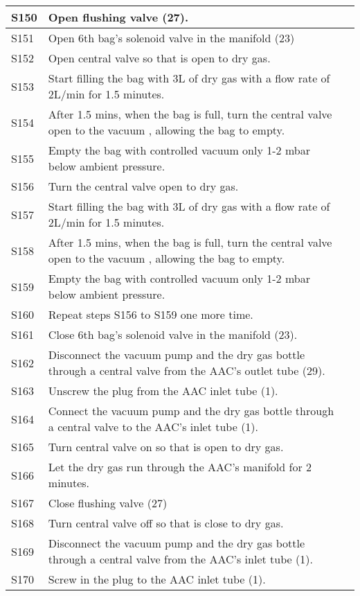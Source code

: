 \begin{longtable} {|m{}|m{}|m{}|}
S150 & Open flushing valve (27). & \\ \hline
S151 & Open 6th bag's solenoid valve in the manifold (23) & \\ \hline
S152 & Open central valve so that is open to dry gas. & \\ \hline
S153 & Start filling the bag with 3L of dry gas with a flow rate of 2L/min for 1.5 minutes. & \\ \hline
S154 & After 1.5 mins, when the bag is full, turn the central valve open to the vacuum , allowing the bag to empty. & \\ \hline
S155 & Empty the bag with controlled vacuum only 1-2 mbar below ambient pressure. & \\ \hline
S156 & Turn the central valve open to dry gas. & \\ \hline
S157 & Start filling the bag with 3L of dry gas with a flow rate of 2L/min for 1.5 minutes. & \\ \hline
S158 & After 1.5 mins, when the bag is full, turn the central valve open to the vacuum , allowing the bag to empty. & \\ \hline
S159 & Empty the bag with controlled vacuum only 1-2 mbar below ambient pressure. & \\ \hline
S160 & Repeat steps S156 to S159 one more time. & \\ \hline
S161 & Close 6th bag's solenoid valve in the manifold (23). & \\ \hline
S162 & Disconnect the vacuum pump and the dry gas bottle through a central valve from the AAC's outlet tube (29). & \\ \hline
S163 & Unscrew the plug from the AAC inlet tube (1). & \\ \hline
S164 & Connect the vacuum pump and the dry gas bottle through a central valve to the AAC's inlet tube (1). & \\ \hline
S165 & Turn central valve on so that is open to dry gas. & \\ \hline
S166 & Let the dry gas run through the AAC's manifold for 2 minutes. & \\ \hline
S167 & Close flushing valve (27) & \\ \hline
S168 & Turn central valve off so that is close to dry gas. & \\ \hline
S169 & Disconnect the vacuum pump and the dry gas bottle through a central valve from the AAC's inlet tube (1). & \\ \hline
S170 & Screw in the plug to the AAC inlet tube (1). & \\ \hline




\end{longtable}
